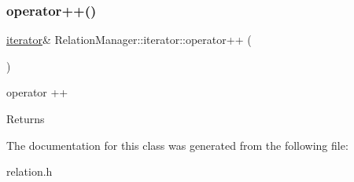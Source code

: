 \subsubsection{\texorpdfstring{operator++()}{operator++()}}
{\footnotesize\ttfamily \hyperlink{class_relation_manager_1_1iterator}{iterator}\& Relation\+Manager\+::iterator\+::operator++ (\begin{DoxyParamCaption}{ }\end{DoxyParamCaption})\hspace{0.3cm}{\ttfamily [inline]}}



operator ++ 

\begin{DoxyReturn}{Returns}

\end{DoxyReturn}


The documentation for this class was generated from the following file\+:\begin{DoxyCompactItemize}
\item 
relation.\+h\end{DoxyCompactItemize}
